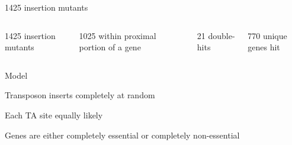 \documentclass[aspectratio=169,12pt,t]{beamer}
\begin{document}
\begin{frame}{1425 insertion mutants}

  \begin{columns}


      \vspace{-10mm}


    \bi
    \item 1425 insertion mutants
    \item 1025 within proximal portion of a gene
    \item 21 double-hits
    \item 770 unique genes hit
    \ei
  \end{columns}


\note{
}
\end{frame}



\begin{frame}{Model}

  {\color{title} Transposon inserts completely at random}

  \bigskip

  \bi
\item Each TA site equally likely
\item Genes are either completely essential or completely
  non-essential
  \ei


  \note{
  }
  \end{frame}
\end{document}
